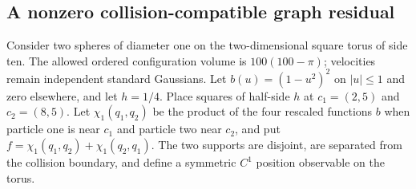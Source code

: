 \subsection{A nonzero collision-compatible graph residual}
Consider two spheres of diameter one on the two-dimensional square
torus of side ten. The allowed ordered configuration volume is
$100(100-\pi)$; velocities remain independent standard Gaussians.
Let $b(u)=(1-u^2)^2$ on $|u|\le1$ and zero elsewhere, and let $h=1/4$.
Place squares of half-side $h$ at $c_1=(2,5)$ and $c_2=(8,5)$.
Let $\chi_1(q_1,q_2)$ be the product of the four rescaled functions $b$
when particle one is near $c_1$ and particle two near $c_2$, and put
$f=\chi_1(q_1,q_2)+\chi_1(q_2,q_1)$. The two supports are disjoint,
are separated from the collision boundary, and define a symmetric
$C^1$ position observable on the torus.

